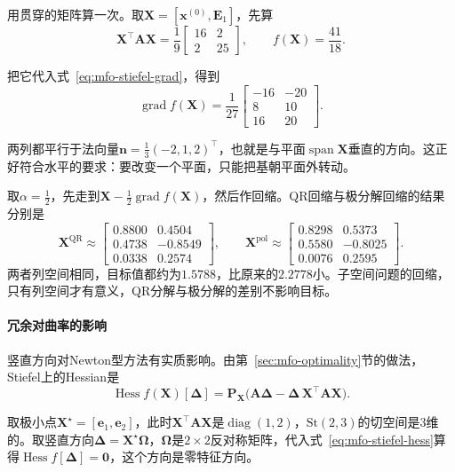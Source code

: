 用贯穿的矩阵算一次。取$\bm{X}=[\bm{x}^{(0)},\bm{E}_1]$，先算
\[
 \bm{X}^\top\bm{A}\bm{X}=\frac19\begin{bmatrix}16&2\\2&25\end{bmatrix},\qquad f(\bm{X})=\frac{41}{18}.
\]

把它代入式~\eqref{eq:mfo-stiefel-grad}，得到
\[
 \operatorname{grad}f(\bm{X})=\frac{1}{27}\begin{bmatrix}-16&-20\\8&10\\16&20\end{bmatrix}.
\]

两列都平行于法向量$\bm{n}=\tfrac13(-2,1,2)^\top$，也就是与平面$\operatorname{span}\bm{X}$垂直的方向。这正好符合水平的要求：要改变一个平面，只能把基朝平面外转动。

取$\alpha=\tfrac12$，先走到$\bm{X}-\tfrac12\operatorname{grad}f(\bm{X})$，然后作回缩。QR回缩与极分解回缩的结果分别是
\[
 \bm{X}^{\mathrm{QR}}\approx\begin{bmatrix}0.8800&0.4504\\0.4738&-0.8549\\0.0338&0.2574\end{bmatrix},\qquad
 \bm{X}^{\mathrm{pol}}\approx\begin{bmatrix}0.8298&0.5373\\0.5580&-0.8025\\0.0076&0.2595\end{bmatrix}.
\]
两者列空间相同，目标值都约为$1.5788$，比原来的$2.2778$小。子空间问题的回缩，只有列空间才有意义，QR分解与极分解的差别不影响目标。

\paragraph{冗余对曲率的影响}
竖直方向对Newton型方法有实质影响。由第~\ref{sec:mfo-optimality}节的做法，Stiefel上的Hessian是
\begin{equation}
 \operatorname{Hess}f(\bm{X})[\bm{\Delta}]=\bm{P}_{\bm{X}}\bigl(\bm{A}\bm{\Delta}-\bm{\Delta}\,\bm{X}^\top\bm{A}\bm{X}\bigr).
 \label{eq:mfo-stiefel-hess}
\end{equation}

取极小点$\bm{X}^\star=[\bm{e}_1,\bm{e}_2]$，此时$\bm{X}^\top\bm{A}\bm{X}$是$\operatorname{diag}(1,2)$，$\mathrm{St}(2,3)$的切空间是$3$维的。取竖直方向$\bm{\Delta}=\bm{X}^\star\bm{\Omega}$，$\bm{\Omega}$是$2\times2$反对称矩阵，代入式~\eqref{eq:mfo-stiefel-hess}算得$\operatorname{Hess}f[\bm{\Delta}]=\bm{0}$，这个方向是零特征方向。

